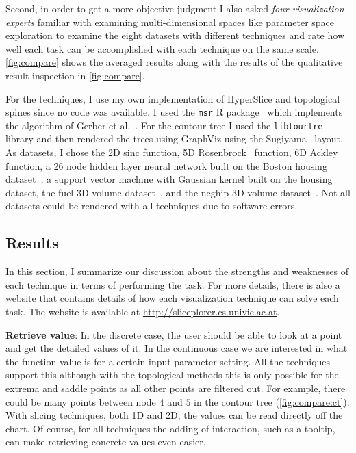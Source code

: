 Second, in order to get a more objective judgment I also asked 
\textit{four visualization experts} familiar with examining multi-dimensional spaces like
parameter space exploration to examine the eight datasets with different
techniques and rate how well each task can be accomplished with each technique
on the same scale. \autoref{fig:compare} shows the averaged results along with the
results of the qualitative result inspection in \autoref{fig:compare}.

For the techniques, I use my own implementation of HyperSlice and topological
spines since no code was available. I used the \texttt{msr} R
package~\cite{Gerber:2012} which implements the algorithm of Gerber et
al.~\cite{Gerber:2010}. For the contour tree I used the \texttt{libtourtre}
library and then rendered the trees using GraphViz using the
Sugiyama~\cite{Gansner:1993} layout.  As datasets, I chose the 2D sinc
function, 5D Rosenbrock~\cite{Rosenbrock:1960} function, 6D Ackley function, a
26 node hidden layer neural network built on the Boston housing
dataset~\cite{Lichman:2013}, a support vector machine with Gaussian kernel
built on the housing dataset, the fuel 3D volume dataset~\cite{Roettger:2017},
and the neghip 3D volume dataset~\cite{Roettger:2017}.  
Not all datasets could be rendered with all techniques due to software errors.

\subsection{Results}\label{sec:task-solutions}

In this section, I summarize our discussion about the strengths and weaknesses
of each technique in terms of performing the task.  For more details, there is
also a website that contains details of how each visualization technique can
solve each task. The website is available at
\url{http://sliceplorer.cs.univie.ac.at}.


\textbf{Retrieve value}:\label{retrieve-value}
In the discrete case, the user should be able to look at a point and get the
detailed values of it. In the continuous case we are interested in what the
function value is for a certain input parameter setting. All the techniques
support this although with the topological methods this is only possible for
the extrema and saddle points as all other points are filtered out. For
example, there could be many points between node $4$ and $5$ in the contour
tree (\autoref{fig:compare:ct}). With
slicing techniques, both 1D and 2D, the values can be read directly off the
chart. Of course, for all techniques the adding of interaction, such as a tooltip, can make retrieving concrete values even easier. 

